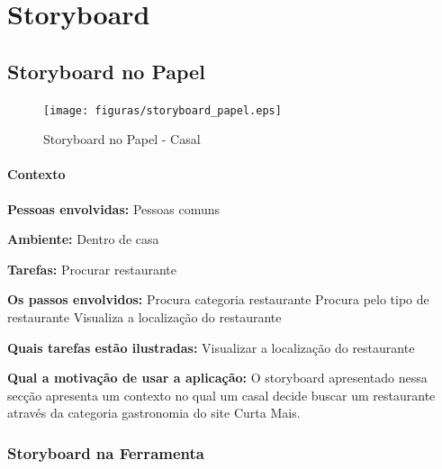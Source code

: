 \chapter[Storyboard]{Storyboard}

\section{Storyboard no Papel}

\begin{figure}[H]
	\begin{center}
		\texttt{[image: figuras/storyboard\_papel.eps]}
		\caption{Storyboard no Papel - Casal}
	\end{center}
\end{figure}

\subsubsection{Contexto}

\raggedbottom
 \textbf{Pessoas envolvidas:} 
		Pessoas comuns

 \textbf{Ambiente:}
		Dentro de casa

 \textbf{Tarefas:}
		Procurar restaurante

 \textbf{Os passos envolvidos:}
		Procura categoria restaurante
		Procura pelo tipo de restaurante
		Visualiza a localização do restaurante

 \textbf{Quais tarefas estão ilustradas:}
	Visualizar a localização do restaurante

 \textbf{Qual a motivação de usar a aplicação:}
		O storyboard apresentado nessa secção apresenta um contexto no qual um casal decide buscar um restaurante através da categoria gastronomia do site Curta Mais.


\subsection{Storyboard na Ferramenta}

